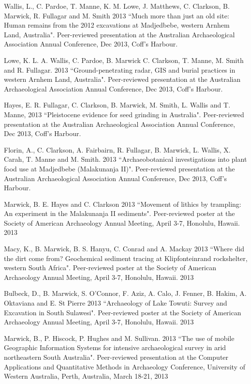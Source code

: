 {{{\ind Wallis, L., C. Pardoe, T. Manne, K. M. Lowe, J. Matthews, C.   Clarkson, B. Marwick, R. Fullagar and M. Smith 2013 ``Much more than just an old site: Human remains from the 2012 excavations at Madjedbebe, western Arnhem Land, Australia". Peer-reviewed presentation at the Australian Archaeological Association Annual Conference, Dec 2013, Coff’s Harbour.

\ind Lowe, K. L. A. Wallis, C. Pardoe, B. Marwick C. Clarkson, T. Manne, M. Smith and R. Fullagar. 2013 ``Ground-penetrating radar, GIS and burial practices in western Arnhem Land, Australia". Peer-reviewed presentation at the Australian Archaeological Association Annual Conference, Dec 2013, Coff’s Harbour.

\ind Hayes, E.  R. Fullagar, C. Clarkson, B. Marwick, M. Smith, L. Wallis and T. Manne, 2013 ``Pleistocene evidence for seed grinding in Australia". Peer-reviewed presentation at the Australian Archaeological Association Annual Conference, Dec 2013, Coff’s Harbour.

\ind Florin, A., C. Clarkson, A. Fairbairn, R. Fullagar, B. Marwick, L. Wallis, X. Carah, T. Manne and M. Smith. 2013 ``Archaeobotanical investigations into plant food use at Madjedbebe (Malakunanja II)". Peer-reviewed presentation at the Australian Archaeological Association Annual Conference, Dec 2013, Coff’s Harbour.

\ind Marwick, B. E. Hayes and C. Clarkson 2013 ``Movement of lithics by trampling: An experiment in the Malakunanja II sediments". Peer-reviewed poster at the Society of American Archaeology Annual Meeting, April 3-7, Honolulu, Hawaii. 2013

\ind Macy, K., B. Marwick, B. S. Hanyu, C. Conrad and A. Mackay 2013 ``Where did the dirt come from? Geochemical sediment tracing at Klipfonteinrand rockshelter, western South Africa". Peer-reviewed poster at the Society of American Archaeology Annual Meeting, April 3-7, Honolulu, Hawaii. 2013

\ind Bulbeck, D., B. Marwick, S. O'Connor, F. Aziz, A. Calo, J. Fenner, B. Hakim, A. Oktaviana and E. St Pierre 2013 ``Archaeology of Lake Towuti: Survey and Excavation in South Sulawesi". Peer-reviewed poster at the Society of American Archaeology Annual Meeting, April 3-7, Honolulu, Hawaii. 2013

\ind Marwick, B., P. Hiscock, P. Hughes and M. Sullivan. 2013 ``The use of mobile Geographic Information Systems for intensive archaeological survey in arid northeastern South Australia". Peer-reviewed presentation at the Computer Applications and Quantitative Methods in Archaeology Conference, University of Western Australia, Perth, Australia, March 18-21, 2013

}}}
